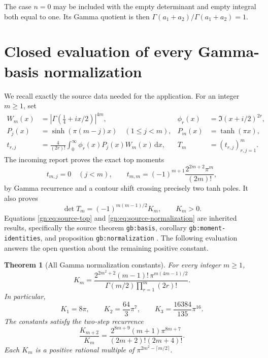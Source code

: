 \documentclass[11pt,a4paper]{article}
\numberwithin{equation}{section}
\newtheorem{theorem}{Theorem}[section]
\theoremstyle{definition}
\theoremstyle{remark}
\newcommand{\dd}{\,\mathrm d}
\begin{document}
The case $n=0$ may be included with the empty determinant and empty
integral both equal to one.  Its Gamma quotient is then
$\Gamma(a_1+a_2)/\Gamma(a_1+a_2)=1$.

\section{Closed evaluation of every Gamma-basis normalization}
\label{gn:sec:normalization}

We recall exactly the source data needed for the application.  For an
integer $m\ge1$, set
\begin{align}
 W_m(x)&=|\Gamma(\tfrac14+ix/2)|^{4m},
       &\phi_r(x)&=\Im(x+i/2)^{2r},\label{gn:eq:source-weight}\\
 P_j(x)&=\sinh(\pi(m-j)x)\quad(1\le j<m),
       &P_m(x)&=\tanh(\pi x),\label{gn:eq:source-multipliers}\\
 t_{r,j}&=\frac4{(2r)!}\int_0^\infty
                 \phi_r(x)P_j(x)W_m(x)\dd x,
       &T_m&=(t_{r,j})_{r,j=1}^m.\label{gn:eq:source-matrix}
\end{align}
The incoming report proves the exact top moments
\begin{equation}\label{gn:eq:source-top}
 t_{m,j}=0\quad(j<m),\qquad
 t_{m,m}=(-1)^{m+1}\frac{2^{2m+2}\pi^m}{(2m)!},
\end{equation}
by Gamma recurrence and a contour shift crossing precisely two tanh
poles.  It also proves
\begin{equation}\label{gn:eq:source-normalization}
 \det T_m=(-1)^{m(m-1)/2}K_m,\qquad K_m>0.
\end{equation}
Equations \eqref{gn:eq:source-top} and
\eqref{gn:eq:source-normalization} are inherited results, specifically
the source theorem \texttt{gb:basis}, corollary
\texttt{gb:moment-identities}, and proposition
\texttt{gb:normalization} \cite{repoordered}.  The following evaluation
answers the open question about the remaining positive constant.

\begin{theorem}[All Gamma normalization constants]
\label{gn:thm:K}
For every integer $m\ge1$,
\begin{equation}\label{gn:eq:K}
 \boxed{\displaystyle
 K_m=\frac{2^{2m^2+2}(m-1)!\,\pi^{m(4m-1)/2}}
              {\Gamma(m/2)\prod_{r=1}^m(2r)!}.}
\end{equation}
In particular,
\begin{equation}\label{gn:eq:K-values}
 K_1=8\pi,\qquad
 K_2=\frac{64}{3}\pi^7,\qquad
 K_3=\frac{16384}{135}\pi^{16}.
\end{equation}
The constants satisfy the two-step recurrence
\begin{equation}\label{gn:eq:K-recurrence}
 \boxed{\displaystyle
 \frac{K_{m+2}}{K_m}
   =\frac{2^{8m+9}(m+1)\pi^{8m+7}}
              {(2m+2)!(2m+4)!}.}
\end{equation}
Each $K_m$ is a positive rational multiple of
$\pi^{2m^2-\lceil m/2\rceil}$.
\end{theorem}
\end{document}
